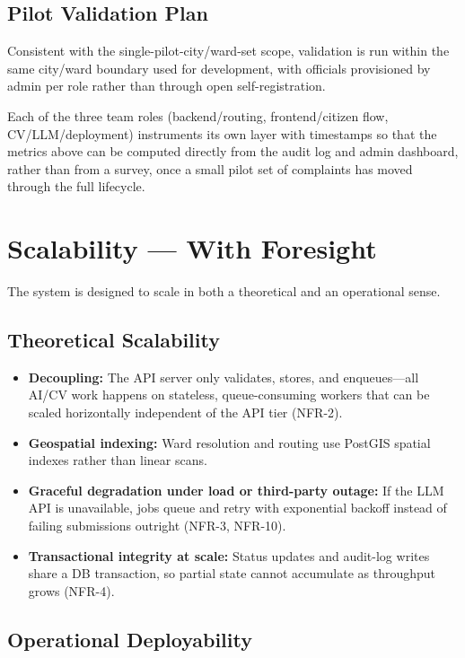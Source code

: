 \documentclass[12pt,a4paper]{article}
\begin{document}
\subsection{Pilot Validation Plan}

Consistent with the single-pilot-city/ward-set scope, validation is run within the same city/ward boundary used for development, with officials provisioned by admin per role rather than through open self-registration.

Each of the three team roles (backend/routing, frontend/citizen flow, CV/LLM/deployment) instruments its own layer with timestamps so that the metrics above can be computed directly from the audit log and admin dashboard, rather than from a survey, once a small pilot set of complaints has moved through the full lifecycle.

\section{Scalability --- With Foresight}

The system is designed to scale in both a theoretical and an operational sense.

\subsection{Theoretical Scalability}

\begin{itemize}
    \item \textbf{Decoupling:} The API server only validates, stores, and enqueues---all AI/CV work happens on stateless, queue-consuming workers that can be scaled horizontally independent of the API tier (NFR-2).
    \item \textbf{Geospatial indexing:} Ward resolution and routing use PostGIS spatial indexes rather than linear scans.
    \item \textbf{Graceful degradation under load or third-party outage:} If the LLM API is unavailable, jobs queue and retry with exponential backoff instead of failing submissions outright (NFR-3, NFR-10).
    \item \textbf{Transactional integrity at scale:} Status updates and audit-log writes share a DB transaction, so partial state cannot accumulate as throughput grows (NFR-4).
\end{itemize}

\subsection{Operational Deployability}
\end{document}
